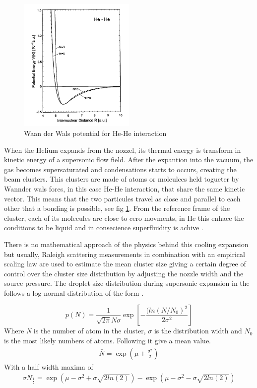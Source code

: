\begin{figure}[h!]
\centering
	\includegraphics[width=0.5\textwidth]{../Images/waanderwaal_hehe.PNG}
	\caption[Waan der Wall He-He potential]{ Waan der Wals potential for He-He interaction}
	\label{img:WanderHe}
\end{figure}


When the Helium expands from the nozzel, its thermal energy is transform in kinetic energy of a supersonic flow field. After the expantion into the vacuum, the gas becomes supersaturated and condensations starts to occurs, creating the beam clusters. This clusters are made of atoms or moleulces held togueter by Wannder wals fores, in this case He-He interaction, that share the same kinetic vector. This means that the two particules travel as close and parallel to each other that a bonding is possible, see fig \ref{img:WanderHe}. From the reference frame of the cluster, each of its molecules are close to cero movments, in He this enhace the conditions to be liquid and in consecience superfluidity is achive  \cite{hagena_cluster_1972}.
 

There is no mathematical approach of the physics behind this cooling expansion but usually, Raleigh scattering measurements in combination with an empirical scaling law \cite{hagena_cluster_1972} are used to estimate the mean cluster size giving a certain degree of control over the cluster size distribution by adjusting the nozzle width and the source pressure. The droplet size distribution during supersonic expansion in the follows a log-normal distribution of the form \cite{harms_density_1998}.

\begin{equation}
p(N) = \frac{1}{\sqrt{2\pi}N \sigma} \exp  \left[- \frac{(ln(N/N_{0})^2}{2\sigma^2} \right]
\end{equation}
Where \textit{N} is the number of atom in the cluster, $\sigma$ is the distribution width and \textit{$N_{0}$} is the most likely numbers of atoms. Following it give a mean value.
\begin{align}
\bar N = \exp  \left(\mu+\frac{\sigma^2}{2} \right)
\end{align}
With a half width maxima of \cite{harms_density_1998}
\begin{align}
\sigma N_{\frac{1}{2}} = \exp \left( \mu - \sigma ^2 + \sigma \sqrt{2 ln(2)} \right) - \exp \left(  \mu - \sigma ^2 - \sigma \sqrt{2 ln(2)}  \right)
\end{align}

